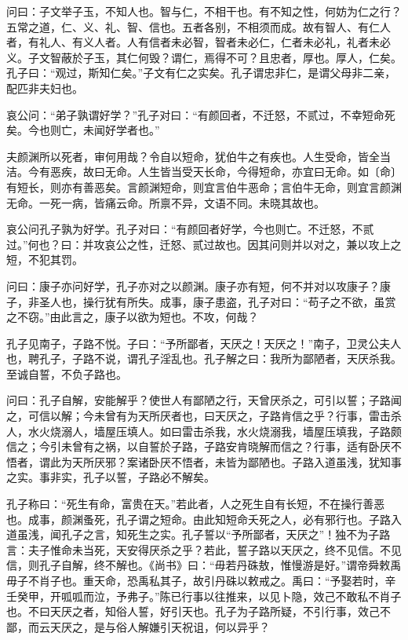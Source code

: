 \documentclass[]{article}
\begin{document}
问曰：子文举子玉，不知人也。智与仁，不相干也。有不知之性，何妨为仁之行？五常之道，仁、义、礼、智、信也。五者各别，不相须而成。故有智人、有仁人者，有礼人、有义人者。人有信者未必智，智者未必仁，仁者未必礼，礼者未必义。子文智蔽於子玉，其仁何毁？谓仁，焉得不可？且忠者，厚也。厚人，仁矣。孔子曰：``观过，斯知仁矣。''子文有仁之实矣。孔子谓忠非仁，是谓父母非二亲，配匹非夫妇也。

哀公问：``弟子孰谓好学？''孔子对曰：``有颜回者，不迁怒，不贰过，不幸短命死矣。今也则亡，未闻好学者也。''

夫颜渊所以死者，审何用哉？令自以短命，犹伯牛之有疾也。人生受命，皆全当洁。今有恶疾，故曰无命。人生皆当受天长命，今得短命，亦宜曰无命。如〔命〕有短长，则亦有善恶矣。言颜渊短命，则宜言伯牛恶命；言伯牛无命，则宜言颜渊无命。一死一病，皆痛云命。所禀不异，文语不同。未晓其故也。

哀公问孔子孰为好学。孔子对曰：``有颜回者好学，今也则亡。不迁怒，不贰过。''何也？曰：并攻哀公之性，迁怒、贰过故也。因其问则并以对之，兼以攻上之短，不犯其罚。

问曰：康子亦问好学，孔子亦对之以颜渊。康子亦有短，何不并对以攻康子？康子，非圣人也，操行犹有所失。成事，康子患盗，孔子对曰：``苟子之不欲，虽赏之不窃。''由此言之，康子以欲为短也。不攻，何哉？

孔子见南子，子路不悦。子曰：``予所鄙者，天厌之！天厌之！''南子，卫灵公夫人也，聘孔子，子路不说，谓孔子淫乱也。孔子解之曰：我所为鄙陋者，天厌杀我。至诚自誓，不负子路也。

问曰：孔子自解，安能解乎？使世人有鄙陋之行，天曾厌杀之，可引以誓；子路闻之，可信以解；今未曾有为天所厌者也，曰天厌之，子路肯信之乎？行事，雷击杀人，水火烧溺人，墙屋压填人。如曰雷击杀我，水火烧溺我，墙屋压填我，子路颇信之；今引未曾有之祸，以自誓於子路，子路安肯晓解而信之？行事，适有卧厌不悟者，谓此为天所厌邪？案诸卧厌不悟者，未皆为鄙陋也。子路入道虽浅，犹知事之实。事非实，孔子以誓，子路必不解矣。

孔子称曰：``死生有命，富贵在天。''若此者，人之死生自有长短，不在操行善恶也。成事，颜渊蚤死，孔子谓之短命。由此知短命夭死之人，必有邪行也。子路入道虽浅，闻孔子之言，知死生之实。孔子誓以``予所鄙者，天厌之''！独不为子路言：夫子惟命未当死，天安得厌杀之乎？若此，誓子路以天厌之，终不见信。不见信，则孔子自解，终不解也。《尚书》曰：``毋若丹硃敖，惟慢游是好。''谓帝舜敕禹毋子不肖子也。重天命，恐禹私其子，故引丹硃以敕戒之。禹曰：``予娶若时，辛壬癸甲，开呱呱而泣，予弗子。''陈已行事以往推来，以见卜隐，效己不敢私不肖子也。不曰天厌之者，知俗人誓，好引天也。孔子为子路所疑，不引行事，效己不鄙，而云天厌之，是与俗人解嫌引天祝诅，何以异乎？
\end{document}
